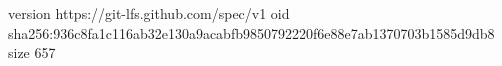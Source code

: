 version https://git-lfs.github.com/spec/v1
oid sha256:936c8fa1c116ab32e130a9acabfb9850792220f6e88e7ab1370703b1585d9db8
size 657
